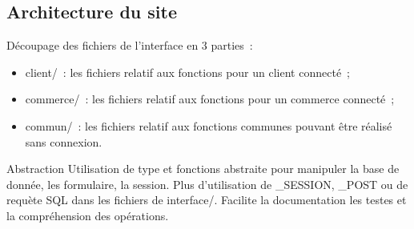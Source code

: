 \documentclass{beamer}
\begin{document}
\subsection{Architecture du site}

\begin{frame}
	Découpage des fichiers de l'interface en 3 parties~:
	\begin{itemize}
		\item client/~: les fichiers relatif aux fonctions pour un client connecté~;
		\item commerce/~: les fichiers relatif aux fonctions pour un commerce connecté~;
		\item commun/~: les fichiers relatif aux fonctions communes pouvant être réalisé sans connexion.
	\end{itemize}
\end{frame}

\begin{frame}{Abstraction}
	Utilisation de type et fonctions abstraite pour manipuler la base de donnée, les formulaire, la session.
	\bigbreak
	Plus d'utilisation de \_SESSION, \_POST ou de requète SQL dans les fichiers de interface/.
	\bigbreak
	Facilite la documentation les testes et la compréhension des opérations.
\end{frame}
\end{document}

